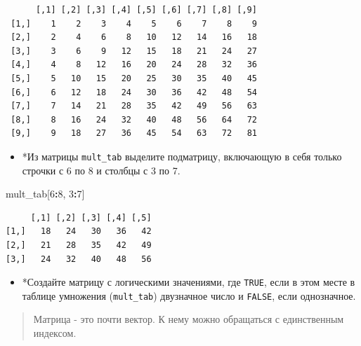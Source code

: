 \documentclass[
]{book}
\newenvironment{Shaded}{\begin{snugshade}}{\end{snugshade}}
\newcommand{\CommentTok}[1]{\textcolor[rgb]{0.56,0.35,0.01}{\textit{#1}}}
\newcommand{\DecValTok}[1]{\textcolor[rgb]{0.00,0.00,0.81}{#1}}
\newcommand{\NormalTok}[1]{#1}
\newcommand{\OperatorTok}[1]{\textcolor[rgb]{0.81,0.36,0.00}{\textbf{#1}}}
\providecommand{\tightlist}{%
  \setlength{\itemsep}{0pt}\setlength{\parskip}{0pt}}
\begin{document}
\begin{verbatim}
      [,1] [,2] [,3] [,4] [,5] [,6] [,7] [,8] [,9]
 [1,]    1    2    3    4    5    6    7    8    9
 [2,]    2    4    6    8   10   12   14   16   18
 [3,]    3    6    9   12   15   18   21   24   27
 [4,]    4    8   12   16   20   24   28   32   36
 [5,]    5   10   15   20   25   30   35   40   45
 [6,]    6   12   18   24   30   36   42   48   54
 [7,]    7   14   21   28   35   42   49   56   63
 [8,]    8   16   24   32   40   48   56   64   72
 [9,]    9   18   27   36   45   54   63   72   81
\end{verbatim}

\begin{Shaded}
\end{Shaded}

\begin{itemize}
\tightlist
\item
  *Из матрицы \texttt{mult\_tab} выделите подматрицу, включающую в себя только строчки с 6 по 8 и столбцы с 3 по 7.
\end{itemize}

\begin{Shaded}
\begin{Highlighting}[]
\NormalTok{mult_tab[}\DecValTok{6}\OperatorTok{:}\DecValTok{8}\NormalTok{, }\DecValTok{3}\OperatorTok{:}\DecValTok{7}\NormalTok{]}
\end{Highlighting}
\end{Shaded}

\begin{verbatim}
     [,1] [,2] [,3] [,4] [,5]
[1,]   18   24   30   36   42
[2,]   21   28   35   42   49
[3,]   24   32   40   48   56
\end{verbatim}

\begin{itemize}
\tightlist
\item
  *Создайте матрицу с логическими значениями, где \texttt{TRUE}, если в этом месте в таблице умножения (\texttt{mult\_tab}) двузначное число и \texttt{FALSE}, если однозначное.
\end{itemize}

\begin{quote}
Матрица - это почти вектор. К нему можно обращаться с единственным индексом.
\end{quote}
\end{document}
